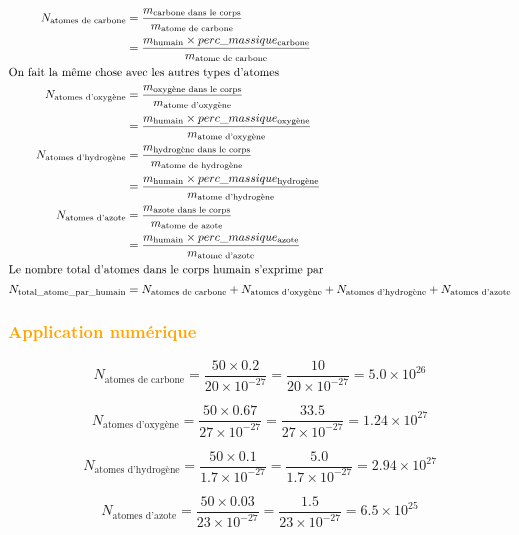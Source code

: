 \documentclass[a4paper,12pt]{article}
\begin{document}
\begin{align*}
  N_{\text{atomes de carbone}} & = \frac{m_{\text{carbone dans le corps}}}{m_{\text{atome de carbone}}} \\
                               & = \frac{m_{\text{humain}} \times perc\_massique_{\text{carbone}}}{m_{\text{atome de carbone}}} \\ 
  \intertext{On fait la même chose avec les autres types d'atomes}
  N_{\text{atomes d'oxygène}} & = \frac{m_{\text{oxygène dans le corps}}}{m_{\text{atome d'oxygène}}} \\
                              & = \frac{m_{\text{humain}} \times perc\_massique_{\text{oxygène}}}{m_{\text{atome d'oxygène}}} \\
  N_{\text{atomes d'hydrogène}} & = \frac{m_{\text{hydrogène dans le corps}}}{m_{\text{atome de hydrogène}}} \\
                              & = \frac{m_{\text{humain}} \times perc\_massique_{\text{hydrogène}}}{m_{\text{atome d'hydrogène}}} \\
  N_{\text{atomes d'azote}} & = \frac{m_{\text{azote dans le corps}}}{m_{\text{atome de azote}}} \\
                              & = \frac{m_{\text{humain}} \times perc\_massique_{\text{azote}}}{m_{\text{atome d'azote}}} \\
  \intertext{Le nombre total d'atomes dans le corps humain s'exprime par}
  N_{\text{total\_atome\_par\_humain}} & = N_{\text{atomes de carbone}} + N_{\text{atomes d'oxygène}} + N_{\text{atomes d'hydrogène}} + N_{\text{atomes d'azote}}
\end{align*}

\subsubsection*{\textcolor{orange}{Application numérique}}


\[
N_{\text{atomes de carbone}} = \frac{50 \times 0.2}{20 \times 10^{-27}} = \frac{10}{20 \times 10^{-27}} = 5.0 \times 10^{26}
\]

\[
N_{\text{atomes d'oxygène}} = \frac{50 \times 0.67}{27 \times 10^{-27}} = \frac{33.5}{27 \times 10^{-27}} = 1.24 \times 10^{27}
\]

\[
N_{\text{atomes d'hydrogène}} = \frac{50 \times 0.1}{1.7 \times 10^{-27}} = \frac{5.0}{1.7 \times 10^{-27}} = 2.94 \times 10^{27}
\]

\[
N_{\text{atomes d'azote}} = \frac{50 \times 0.03}{23 \times 10^{-27}} = \frac{1.5}{23 \times 10^{-27}} = 6.5 \times 10^{25}
\]
\end{document}
